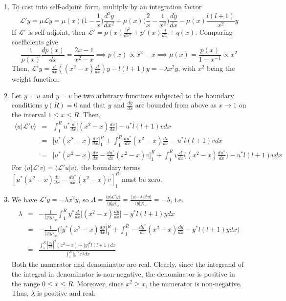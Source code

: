 \documentclass[a4paper]{article}
\begin{document}
\begin{ans}\leavevmode
\begin{enumerate}[label=(\roman*)]
\item To cast into self-adjoint form, multiply by an integration factor
$$\mathcal{L}'y=\mu\mathcal{L}y=\mu(x)\bigg(1-\frac{1}{x}\bigg)\frac{d^2y}{dx^2}+\mu(x)\bigg(\frac{2}{x}-\frac{1}{x^2}\bigg)\frac{dy}{dx}-\mu(x)\frac{l(l+1)}{x^2}y$$
If $\mathcal{L}'$ is self-adjoint, then $\mathcal{L}'=p(x)\frac{d^2}{dx^2}+p'(x)\frac{d}{dx}+q(x)$. Comparing coefficients give
$$\frac{1}{p(x)}\frac{dp(x)}{dx}=\frac{2x-1}{x^2-x}\implies p(x)\propto x^2-x\implies\mu(x)=\frac{p(x)}{1-x^{-1}}\propto x^2$$
Then, $\mathcal{L}'y=\frac{d}{dx}((x^2-x)\frac{d}{dx})y-l(l+1)y=-\lambda x^2y$, with $x^2$ being the weight function.
\item Let $y=u$ and $y=v$ be two arbitrary functions subjected to the boundary conditions $y(R)=0$ and that $y$ and $\frac{dy}{dx}$ are bounded from above as $x\rightarrow 1$ on the interval $1\leq x\leq R$. Then,
\begin{eqnarray}
\langle u|\mathcal{L}'v\rangle&=&\int_1^Ru^*\frac{d}{dx}\bigg[(x^2-x)\frac{dv}{dx}\bigg]-u^*l(l+1)vdx\nonumber\\&=&\bigg[u^*(x^2-x)\frac{dv}{dx}\bigg]_1^R+\int_1^R\frac{du^*}{dx}(x^2-x)\frac{dv}{dx}-u^*l(l+1)vdx\nonumber\\&=&\bigg[u^*(x^2-x)\frac{dv}{dx}-\frac{du^*}{dx}(x^2-x)v\bigg]^R_1+\int_1^Rv\frac{d}{dx}\bigg((x^2-x)\frac{du^*}{dx}\bigg)-u^*l(l+1)vdx\nonumber
\end{eqnarray}
For $\langle u|\mathcal{L}'v\rangle=\langle\mathcal{L}'u|v\rangle$, the boundary terms $[u^*(x^2-x)\frac{dv}{dx}-\frac{du^*}{dx}(x^2-x)v]_1^R$ must be zero.
\item We have $\mathcal{L}'y=-\lambda x^2y$, so $\Lambda=\frac{\langle y|\mathcal{L'}y\rangle}{\langle y|y\rangle_w}=\frac{\langle y|-\lambda x^2y\rangle}{\langle y|y\rangle_w}=-\lambda$, i.e.
\begin{eqnarray}
\lambda&=&-\frac{1}{\langle y|y\rangle_w}\int_1^Ry^*\frac{d}{dx}\bigg[(x^2-x)\frac{dy}{dx}\bigg]-y^*l(l+1)ydx\nonumber\\&=&-\frac{1}{\langle y|y\rangle_w}\bigg(\bigg[y^*(x^2-x)\frac{dy}{dx}\bigg]_1^R+\int_1^R-\frac{dy^*}{dx}(x^2-x)\frac{dy}{dx}-y^*l(l+1)ydx\bigg)\nonumber\\&=&\frac{\int_1^R|\frac{dy}{dx}|^2(x^2-x)+|y|^2l(l+1)dx}{\int_1^R|y|^2x^2dx}\nonumber
\end{eqnarray}
Both the numerator and denominator are real. Clearly, since the integrand of the integral in denominator is non-negative, the denominator is positive in the range $0\leq x\leq R$. Moreover, since $x^2\geq x$, the numerator is non-negative. Thus, $\lambda$ is positive and real.

\end{enumerate}
\end{ans}
\end{document}
